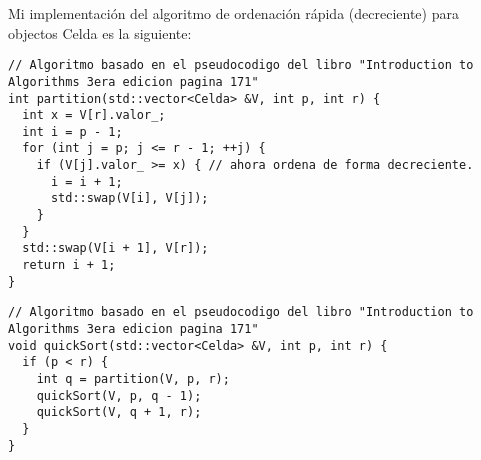 Mi implementación del algoritmo de ordenación rápida (decreciente) para objectos Celda es la siguiente:
\begin{lstlisting}
// Algoritmo basado en el pseudocodigo del libro "Introduction to Algorithms 3era edicion pagina 171"
int partition(std::vector<Celda> &V, int p, int r) {
  int x = V[r].valor_;
  int i = p - 1;
  for (int j = p; j <= r - 1; ++j) {
    if (V[j].valor_ >= x) { // ahora ordena de forma decreciente.
      i = i + 1;
      std::swap(V[i], V[j]);
    }
  }
  std::swap(V[i + 1], V[r]);
  return i + 1;
}
\end{lstlisting}

\begin{lstlisting}
// Algoritmo basado en el pseudocodigo del libro "Introduction to Algorithms 3era edicion pagina 171"
void quickSort(std::vector<Celda> &V, int p, int r) {
  if (p < r) {
    int q = partition(V, p, r);
    quickSort(V, p, q - 1);
    quickSort(V, q + 1, r);
  }
}
    
\end{lstlisting}